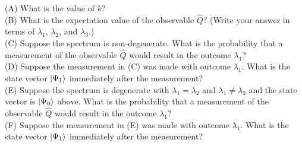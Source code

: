 \documentclass[12pt]{article}
\begin{document}
\noindent
(A) What is the value of $k$?\\[8pt]
\noindent
(B) What is the expectation value of the observable $\hat{Q}$? (Write your answer in terms of $\lambda_1$, $\lambda_2$, and $\lambda_3$.)\\[8pt]
\noindent
(C) Suppose the spectrum is non-degenerate.  What is the probability that a measurement of the observable $\hat{Q}$ would result in the outcome $\lambda_1$?\\[8pt]
\noindent
(D) Suppose the measurement in (C) was made with outcome $\lambda_1$. What is the state vector 
$\ket{\Psi_1}$ immediately after the measurement?\\[8pt]
\noindent
(E) Suppose the spectrum is degenerate with $\lambda_1 = \lambda_2$ and $\lambda_1 \neq \lambda_3$ and the state vector is $\ket{\Psi_0}$ above.  What is the probability that a measurement of the observable $\hat{Q}$ would result in the outcome $\lambda_1$?\\[8pt]
\noindent
(F) Suppose the measurement in (E) was made with outcome $\lambda_1$. What is the state vector 
$\ket{\Psi_1}$ immediately after the measurement?\\[8pt]

\newpage
\end{document}
